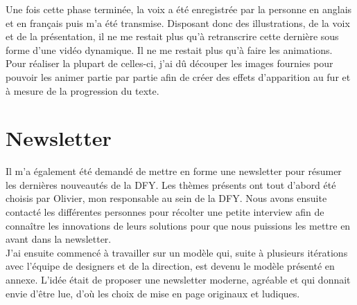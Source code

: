 Une fois cette phase terminée, la voix a été enregistrée par la personne en anglais et en français puis m'a été transmise. Disposant donc des illustrations, de la voix et de la présentation, il ne me restait plus qu'à retranscrire cette dernière sous forme d'une vidéo dynamique. Il ne me restait plus qu'à faire les animations. Pour réaliser la plupart de  celles-ci, j'ai dû découper les images fournies pour pouvoir les animer partie par partie afin de créer des effets d'apparition au fur et à mesure de la progression du texte. 


\section{Newsletter}

Il m'a également été demandé de mettre en forme une newsletter pour résumer les dernières nouveautés de la DFY. Les thèmes présents ont tout d'abord été choisis par Olivier, mon responsable au sein de la DFY. Nous avons ensuite contacté les différentes personnes pour récolter une petite interview afin de connaître les innovations de leurs solutions pour que nous puissions les mettre en avant dans la newsletter.\\

J'ai ensuite commencé à travailler sur un modèle qui, suite à plusieurs itérations avec
l’équipe de designers et de la direction, est devenu le modèle présenté en annexe. L'idée était de proposer une newsletter moderne, agréable et qui donnait envie d'être lue, d'où les choix de mise en page originaux et ludiques.



